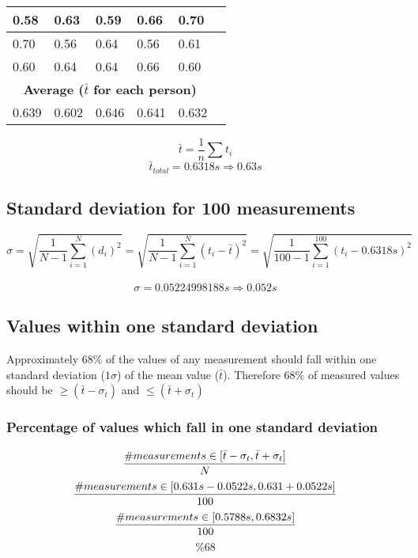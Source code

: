 \documentclass[11pt, letterpaper, includehead]{article}
\begin{document}
\begin{center}
\begin{tabular}{|   m{2cm}  |  m{2cm}  |  m{2cm}  |  m{2cm}  |  m{2cm}  |  m{2cm}  | }
    \hline
    0.58          & 0.63           & 0.59         & 0.66           & 0.70          \\
    \hline
    0.70          & 0.56           & 0.64         & 0.56           & 0.61          \\
    \hline
    0.60          & 0.64           & 0.64         & 0.66           & 0.60          \\
    \hline
    \hline
    \multicolumn{5}{|c|}{\textbf{Average ($\bar{t}$ for each person)}} \\
    \hline
    0.639         & 0.602          & 0.646        & 0.641          & 0.632         \\
    \hline
  \end{tabular}
\end{center}
$$\bar{t} = \frac{1}{n}\sum t_i$$
$$\bar{t}_{total} = 0.6318s \Rightarrow \boxed{0.63s}$$

\subsection{Standard deviation for 100 measurements} %
$$\sigma = \sqrt{\frac{1}{N - 1}\sum_{i = 1}^{N} (d_i)^2} = \sqrt{\frac{1}{N - 1}\sum_{i = 1}^{N} (t_i - \bar{t})^2}= \sqrt{\frac{1}{100 - 1}\sum_{i = 1}^{100}(t_i - 0.6318s)^2}$$\\
$$\sigma = 0.05224998188s \Rightarrow \boxed{0.052s}$$


\subsection{Values within one standard deviation} %
Approximately $68\%$ of the values of any measurement should fall within one
standard deviation ($1 \sigma$) of the mean value ($\bar{t}$). Therefore $68\%$ of measured
values should be $\geq (\bar{t} - \sigma_t)$ and $\leq (\bar{t} + \sigma_t)$\\

\subsubsection{Percentage of values which fall in one standard deviation}
$$\frac{\# measurements \in [\bar{t} - \sigma_t, \bar{t} + \sigma_t]}{N} \\$$
$$\frac{\# measurements \in [0.631s - 0.0522s, 0.631 + 0.0522s]}{100} \\$$
$$\frac{\# measurements \in [0.5788s, 0.6832s]}{100} \\$$
$$\boxed{\%68}$$
\end{document}

